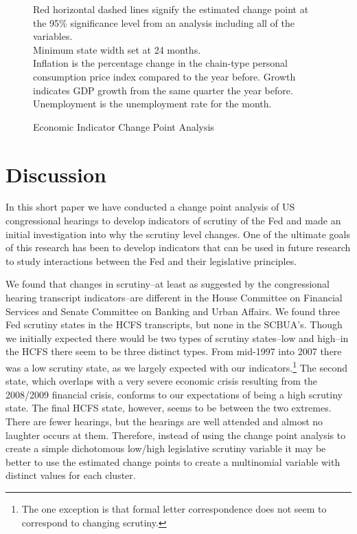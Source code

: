 \documentclass[a4paper]{article}\usepackage[]{graphicx}\usepackage[]{color}
\makeatletter
\newenvironment{kframe}{%
 \def\at@end@of@kframe{}%
 \ifinner\ifhmode%
  \def\at@end@of@kframe{\end{minipage}}%
  \begin{minipage}{\columnwidth}%
 \fi\fi%
 \def\FrameCommand##1{\hskip\@totalleftmargin \hskip-\fboxsep
 \colorbox{shadecolor}{##1}\hskip-\fboxsep
     \hskip-\linewidth \hskip-\@totalleftmargin \hskip\columnwidth}%
 \MakeFramed {\advance\hsize-\width
   \@totalleftmargin\z@ \linewidth\hsize
   \@setminipage}}%
 {\par\unskip\endMakeFramed%
 \at@end@of@kframe}
\newenvironment{knitrout}{}{} %
\makeatother
\begin{document}
\begin{figure}
    \caption{Economic Indicator Change Point Analysis}
    \label{fig:FullEconCP}
\begin{knitrout}
\color{fgcolor}\begin{kframe}


{\ttfamily\noindent\bfseries\color{errorcolor}{\#\# Error: unused arguments (eps = eps, half = half)}}\end{kframe}
\end{knitrout}
{\scriptsize{Red horizontal dashed lines signify the estimated change point at the 95\% significance level from an analysis including all of the variables.\\
Minimum state width set at 24 months. \\
Inflation is the percentage change in the chain-type personal consumption price index compared to the year before. Growth indicates GDP growth from the same quarter the year before. Unemployment is the unemployment rate for the month.}}
\end{figure}


\section{Discussion}

In this short paper we have conducted a change point analysis of US congressional hearings to develop indicators of scrutiny of the Fed and made an initial investigation into why the scrutiny level changes. One of the ultimate goals of this research has been to develop indicators that can be used in future research to study interactions between the Fed and their legislative principles. 

We found that changes in scrutiny--at least as suggested by the congressional hearing transcript indicators--are different in the House Committee on Financial Services and Senate Committee on Banking and Urban Affairs. We found three Fed scrutiny states in the HCFS transcripts, but none in the SCBUA's. Though we initially expected there would be two types of scrutiny states--low and high--in the HCFS there seem to be three distinct types. From mid-1997 into 2007 there was a low scrutiny state, as we largely expected with our indicators.\footnote{The one exception is that formal letter correspondence does not seem to correspond to changing scrutiny.} The second state, which overlaps with a very severe economic crisis resulting from the 2008/2009 financial crisis, conforms to our expectations of being a high scrutiny state. The final HCFS state, however, seems to be between the two extremes. There are fewer hearings, but the hearings are well attended and almost no laughter occurs at them. Therefore, instead of using the change point analysis to create a simple dichotomous low/high legislative scrutiny variable it may be better to use the estimated change points to create a multinomial variable with distinct values for each cluster. 
\end{document}

